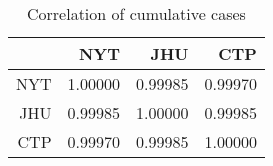 \begin{table}[ht]
\centering
\begin{tabular}{rrrr}
  \hline
 & NYT & JHU & CTP \\ 
  \hline
NYT & 1.00000 & 0.99985 & 0.99970 \\ 
  JHU & 0.99985 & 1.00000 & 0.99985 \\ 
  CTP & 0.99970 & 0.99985 & 1.00000 \\ 
   \hline
\end{tabular}
\caption{Correlation of cumulative cases \label{tab:casecor}} 
\end{table}

